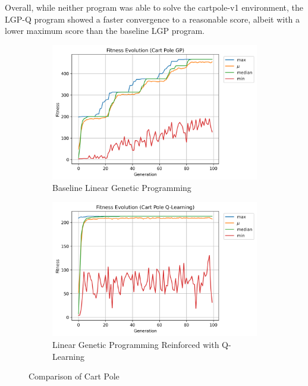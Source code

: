 \documentclass[12pt, final]{dalcsthesis}
\begin{document}
Overall, while neither program was able to solve the cartpole-v1 environment, the LGP-Q program showed a faster convergence to a reasonable score, albeit with a lower maximum score than the baseline LGP program.

\begin{figure}[hb]
	\centering
	\begin{subfigure}{1.0\textwidth}
		\includegraphics[width=\linewidth]{cart_pole_lgp.png}
		\caption{Baseline Linear Genetic Programming}
		\label{fig:cart-pole-lgp}
	\end{subfigure}
	\hfill
	\begin{subfigure}{1.0\textwidth}
		\includegraphics[width=\linewidth]{cart_pole_q.png}
		\caption{Linear Genetic Programming Reinforced with Q-Learning}
		\label{fig:cart-pole-q}
	\end{subfigure}
	\caption{Comparison of Cart Pole}
	\label{fig:cart-pole-comparison}
\end{figure}
\end{document}
